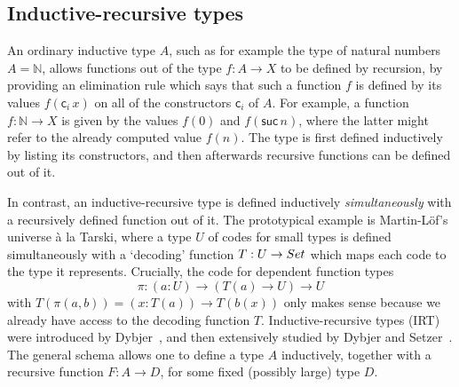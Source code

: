 \documentclass[a4paper,UKenglish,numberwithinsect,cleveref,thm-restate]{lipics-v2021}
\newcommand{\LT}[2][]{\todo[inline,author={L-T},caption={},color={pink},#1]{#2}}
\begin{document}
%

\subsection{Inductive-recursive types}

An ordinary inductive type $A$, such as for example the type of natural numbers $A = \mathbb{N}$, allows functions out of the type $f : A \to X$ to be defined by recursion, by providing an elimination rule which says that such a function $f$ is defined by its values $f(\mathsf{c}_i\,x)$ on all of the constructors $\mathsf{c}_i$ of $A$. For example, a function $f: \mathbb{N} \to X$ is given by the values $f(0)$ and $f(\mathsf{suc}\,n)$, where the latter might refer to the already computed value $f(n)$.
%
The type is first defined inductively by listing its constructors, and then afterwards recursive functions can be defined out of it.

In contrast, an inductive-recursive type is defined inductively \emph{simultaneously} with a recursively defined function out of it. The prototypical example is Martin-L\"of's universe \`a la Tarski, where a type $U$ of codes for small types is defined simultaneously with a `decoding' function $T : U \to \Set$ which maps each code to the type it represents. Crucially, the code for dependent function types
\[
  \pi : (a : U) \to (T(a) \to U) \to U
\]
with $T(\pi(a, b)) = (x : T(a)) \to T(b(x))$ only makes sense because we already have access to the decoding function $T$.
%
Inductive-recursive types (IRT) were introduced by Dybjer~\cite{Dybjer2000}, and then extensively studied by Dybjer and Setzer~\cite{Dybjer1999,Dybjer2003}.
The general schema allows one to define a type $A$ inductively, together with a recursive function $F : A \to D$, for some fixed (possibly large) type $D$.
\end{document}
